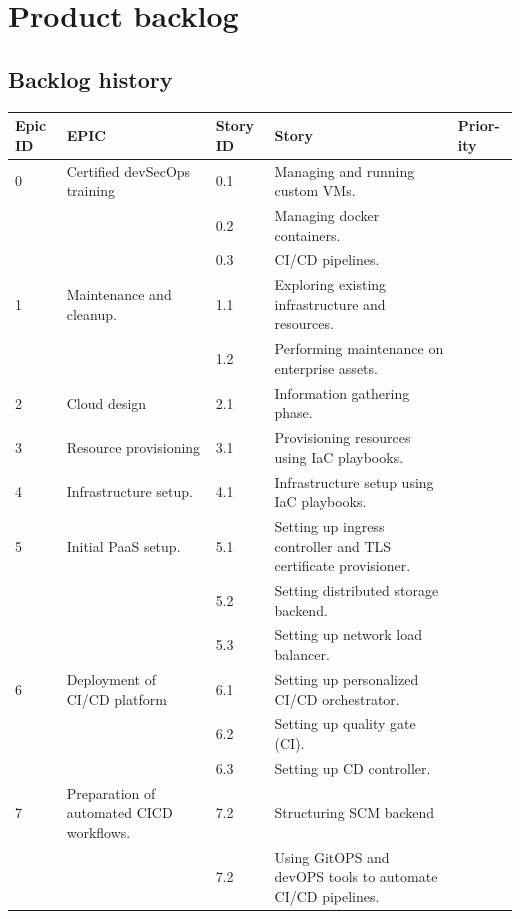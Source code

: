 \section{Product backlog }

\subsection{Backlog history }
\begin{longtable}[H]{|m{1cm}|m{3cm}|m{1cm}|m{7cm}|m{1.2cm}|}
\hline
 {\textbf{Epic ID}} & {\textbf{EPIC}} & {\textbf{Story ID}} & {\textbf{Story}} & {\textbf{Prior-ity}} \\
 \hline
0 & \raggedright Certified devSecOps training &	0.1 &	Managing and running custom VMs. & \\
\cline{3-5}
&   & 0.2 &	Managing docker containers.	& \\
\cline{3-5}
&   & 0.3 &	CI/CD pipelines. & \\
\hline
1 & Maintenance and cleanup. &	1.1	& Exploring existing infrastructure and resources. & \\
\cline{3-5}
&   &	1.2 & Performing maintenance on enterprise assets. & \\

\hline
2 & Cloud design &	2.1 &	Information gathering phase. & \\
\hline
3 & Resource provisioning &	3.1 &	Provisioning resources using IaC playbooks. & \\
\hline
4 & Infrastructure setup. &	4.1 &	Infrastructure setup using IaC playbooks. & \\
\hline
5 & \raggedright Initial PaaS setup. &	5.1 &	Setting up ingress controller and TLS certificate provisioner.	 & \\
\cline{3-5}
&   & 5.2 &	Setting distributed storage backend.	 & \\
\cline{3-5}
&   & 5.3 &	Setting up network load balancer.	 & \\
  \hline
6 & Deployment of CI/CD platform &	6.1 &	Setting up personalized CI/CD orchestrator.	 & \\
\cline{3-5}
&   & 6.2 &	Setting up quality gate (CI).	 & \\
\cline{3-5}
&   & 6.3 & Setting up CD controller.	 & \\
  \hline
7 & \raggedright Preparation of automated CICD workflows. &	7.2 &	Structuring SCM backend	 & \\
\cline{3-5}
&   & 7.2 &	 \raggedright Using GitOPS and devOPS tools to automate CI/CD pipelines.	 & \\
   \hline
   

\end{longtable}
